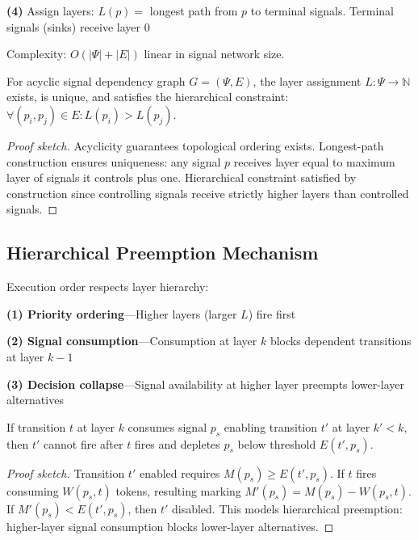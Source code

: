 \vspace{2pt}
\noindent\textbf{(4)} Assign layers: $L(p) = $ longest path from $p$ to terminal signals. Terminal signals (sinks) receive layer 0

\vspace{3pt}
\noindent Complexity: $O(|\Psi| + |E|)$ linear in signal network size.

\begin{theorem}
For acyclic signal dependency graph $G = (\Psi, E)$, the layer assignment $L: \Psi \to \mathbb{N}$ exists, is unique, and satisfies the hierarchical constraint: $\forall (p_i, p_j) \in E: L(p_i) > L(p_j)$.
\end{theorem}

\begin{proof}[Proof sketch]
Acyclicity guarantees topological ordering exists. Longest-path construction ensures uniqueness: any signal $p$ receives layer equal to maximum layer of signals it controls plus one. Hierarchical constraint satisfied by construction since controlling signals receive strictly higher layers than controlled signals.
\end{proof}

\subsection{Hierarchical Preemption Mechanism}

Execution order respects layer hierarchy:

\noindent\textbf{(1) Priority ordering}---Higher layers (larger $L$) fire first

\vspace{4pt}
\noindent\textbf{(2) Signal consumption}---Consumption at layer $k$ blocks dependent transitions at layer $k-1$

\vspace{4pt}
\noindent\textbf{(3) Decision collapse}---Signal availability at higher layer preempts lower-layer alternatives

\vspace{4pt}
\begin{theorem}
If transition $t$ at layer $k$ consumes signal $p_s$ enabling transition $t'$ at layer $k' < k$, then $t'$ cannot fire after $t$ fires and depletes $p_s$ below threshold $E(t', p_s)$.
\end{theorem}

\begin{proof}[Proof sketch]
Transition $t'$ enabled requires $M(p_s) \geq E(t', p_s)$. If $t$ fires consuming $W(p_s, t)$ tokens, resulting marking $M'(p_s) = M(p_s) - W(p_s, t)$. If $M'(p_s) < E(t', p_s)$, then $t'$ disabled. This models hierarchical preemption: higher-layer signal consumption blocks lower-layer alternatives.
\end{proof}

